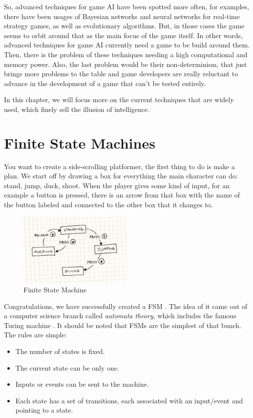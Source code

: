\documentclass[a4paper, 12pt]{book}
\begin{document}
So, advanced techniques for game AI have been spotted more often, for examples, there have been usages of Bayesian networks and neural networks for real-time strategy games, as well as evolutionary algorithms. But, in those cases the game seems to orbit around that as the main focus of the game itself. In other words, advanced techniques for game AI currently need a game to be build around them. Then, there is the problem of these techniques needing a high computational and memory power. Also, the last problem would be their non-determinism, that just brings more problems to the table and game developers are really reluctant to advance in the development of a game that can't be tested entirely.

In this chapter, we will focus more on the current techniques that are widely used, which finely sell the illusion of intelligence.

\section{Finite State Machines}

You want to create a side-scrolling platformer, the first thing to do is make a plan. We start off by drawing a box for everything the main character can do: stand, jump, duck, shoot. When the player gives some kind of input, for an example a button is pressed, there is an arrow from  that box with the name of the button labeled and connected to the other box that it changes to.

\begin{figure}[h]
\begin{center}
\includegraphics[width=0.5\textwidth]{Images/state_FSM.png}
\end{center}
\caption{Finite State Machine \cite{GameProgrammingPattersFMS}}
\label{pic1}
\end{figure}

Congratulations, we have successfully created a FSM \cite{GameProgrammingPattersFMS}. The idea of it came out of a computer science branch called \emph{automata theory}, which includes the famous Turing machine \cite{TuringMachine}. It should be noted that FSMs are the simplest of that bunch. The rules are simple:
\begin{itemize}
    \item The number of states is fixed.
    \item The current state can be only one.
    \item Inputs or events can be sent to the machine.
    \item Each state has a set of transitions, each associated with an input/event and pointing to a state.
\end{itemize}
\end{document}
